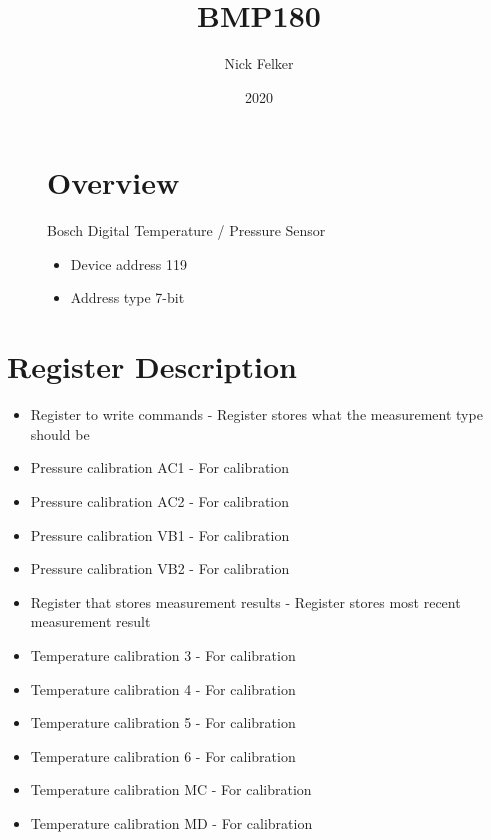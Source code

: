 \documentclass[a4paper,12pt,oneside,pdflatex,italian,final,twocolumn]{article}
\title{ BMP180 }
\author{ Nick Felker }
\date{ 2020 }
\begin{document}
\pagestyle{fancy}



\onecolumn


\begin{figure}
\begin{minipage}{0.47\textwidth}

\section{Overview}
    Bosch Digital Temperature / Pressure Sensor
    \begin{itemize}
        \item Device address 119
        \item Address type 7-bit
    \end{itemize}


\end{minipage}
\hfill

\end{figure}


\section{Register Description}
\begin{itemize}
\item Register to write commands - Register stores what the measurement type should be
\item Pressure calibration AC1 - For calibration
\item Pressure calibration AC2 - For calibration
\item Pressure calibration VB1 - For calibration
\item Pressure calibration VB2 - For calibration
\item Register that stores measurement results - Register stores most recent measurement result
\item Temperature calibration 3 - For calibration
\item Temperature calibration 4 - For calibration
\item Temperature calibration 5 - For calibration
\item Temperature calibration 6 - For calibration
\item Temperature calibration MC - For calibration
\item Temperature calibration MD - For calibration
\end{itemize}
\end{document}
